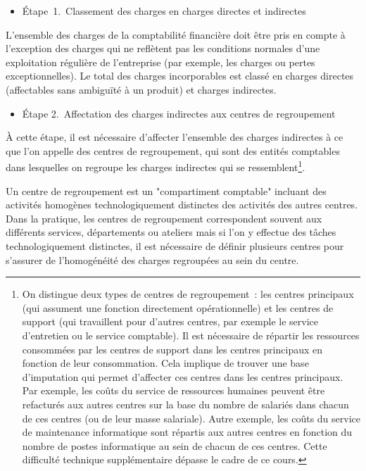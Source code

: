 \documentclass[oneside]{kaobook}
\begin{document}
\begin{itemize}
\item Étape 1. Classement des charges en charges directes et indirectes
\end{itemize}
L'ensemble des charges de la comptabilité financière doit être pris en compte à l'exception des charges qui ne reflètent pas les conditions normales d'une exploitation régulière de l'entreprise (par exemple, les charges ou pertes exceptionnelles). Le total des charges incorporables est classé en charges directes (affectables sans ambiguïté à un produit) et charges indirectes.

\begin{itemize}
\item Étape 2. Affectation des charges indirectes aux centres de regroupement
\end{itemize}
À cette étape, il est nécessaire d'affecter l'ensemble des charges indirectes à ce que l'on appelle des centres de regroupement, qui sont des entités comptables dans lesquelles on regroupe les charges indirectes qui se ressemblent\footnote{On distingue deux types de centres de regroupement : les centres principaux (qui assument une fonction directement opérationnelle) et les centres de support (qui travaillent pour d'autres centres, par exemple le service d'entretien ou le service comptable). Il est nécessaire de répartir les ressources consommées par les centres de support dans les centres principaux en fonction de leur consommation. Cela implique de trouver une base d'imputation qui permet d'affecter ces centres dans les centres principaux. Par exemple, les coûts du service de ressources humaines peuvent être refacturés aux autres centres sur la base du nombre de salariés dans chacun de ces centres (ou de leur masse salariale). Autre exemple, les coûts du service de maintenance informatique sont répartis aux autres centres en fonction du nombre de postes informatique au sein de chacun de ces centres. Cette difficulté technique supplémentaire dépasse le cadre de ce cours.}.

Un centre de regroupement est un "compartiment comptable" incluant des activités homogènes technologiquement distinctes des activités des autres centres. Dans la pratique, les centres de regroupement correspondent souvent aux différents services, départements ou ateliers mais si l'on y effectue des tâches technologiquement distinctes, il est nécessaire de définir plusieurs centres pour s'assurer de l'homogénéité des charges regroupées au sein du centre.
\end{document}
